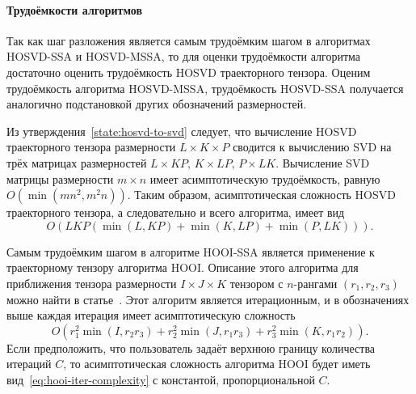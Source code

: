 \documentclass[specialist,
    substylefile = spbu_report.rtx,
    subf,href,colorlinks=true, 12pt]{disser}
\theoremstyle{plain}
\theoremstyle{definition}
\theoremstyle{remark}
\begin{document}
  
    \paragraph{Трудоёмкости алгоритмов}\label{par:alg-complexity}
    Так как шаг разложения является самым трудоёмким шагом в алгоритмах HOSVD-SSA и HOSVD-MSSA,
    то для оценки трудоёмкости алгоритма достаточно оценить трудоёмкость HOSVD траекторного тензора.
    Оценим трудоёмкость алгоритма HOSVD-MSSA, трудоёмкость HOSVD-SSA получается аналогично подстановкой
    других обозначений размерностей.

    Из утверждения~\ref{state:hosvd-to-svd} следует, что вычисление HOSVD траекторного тензора размерности ${L\times K \times P}$
    сводится к вычислению SVD на трёх матрицах размерностей $L\times KP,\, K\times LP,\, P\times LK$.
    Вычисление SVD матрицы размерности $m\times n$ имеет асимптотическую трудоёмкость, равную $O(\min(mn^2, m^2 n)).$
    Таким образом, асимптотическая сложность HOSVD траекторного тензора, а следовательно и всего алгоритма, имеет вид
    \begin{equation}
        \label{eq:hosvd-mssa-complexity}
        O\left(LKP(\min(L, KP) + \min(K, LP) + \min(P, LK))\right).
    \end{equation}

    Самым трудоёмким шагом в алгоритме HOOI-SSA является применение к траекторному тензору алгоритма HOOI.
    Описание этого алгоритма для приближения тензора размерности $I\times J \times K$
    тензором с $n$-рангами $(r_1, r_2, r_3)$ можно найти в статье~\cite{hooi-algorithm}.
    Этот алгоритм является итерационным, и в обозначениях выше каждая итерация имеет асимптотическую сложность
    \begin{equation}
        \label{eq:hooi-iter-complexity}
        O(r_1^2 \min(I, r_2 r_3) + r_2^2 \min(J, r_1 r_3) + r_3^2 \min(K, r_1 r_2)).
    \end{equation}
    Если предположить, что пользователь задаёт верхнюю границу количества итераций $C$, то асимптотическая
    сложность алгоритма HOOI будет иметь вид~\eqref{eq:hooi-iter-complexity} с константой,
    пропорциональной $C$.
    
    
\end{document}
